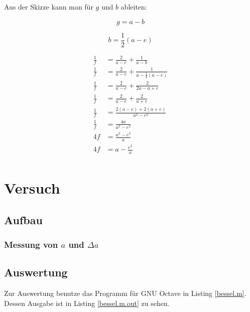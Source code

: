 \documentclass[11pt]{article}
\newcommand{\half}{\frac{1}{2}}
\begin{document}
Aus der Skizze kann man für $g$ und $b$ ableiten:

\begin{equation}
g = a-b
\end{equation}

\begin{equation}
b = \half (a-e)
\end{equation}

\begin{align*}
\frac{1}{f} &= \frac{2}{a-e} + \frac{1}{a-b} \\
\frac{1}{f} &= \frac{2}{a-e} + \frac{1}{a-\half (a-e)} \\
\frac{1}{f} &= \frac{2}{a-e} + \frac{2}{2a-a+e} \\
\frac{1}{f} &= \frac{2}{a-e} + \frac{2}{a+e} \\
\frac{1}{f} &= \frac{2(a-e) + 2(a+e)}{a^2 - e^2} \\
\frac{1}{f} &= \frac{4a}{a^2 - e^2} \\
4f &= \frac{a^2 - e^2}{a} \\
4f &= a - \frac{e^2}{a} \\
\end{align*}

\section{Versuch}

\subsection{Aufbau}

\subsubsection*{Messung von $a$ und $\Delta a$}



\subsection{Auswertung}

Zur Auswertung benutze das Programm für GNU Octave in Listing \ref{bessel.m}. Dessen Ausgabe ist in Listing \ref{bessel.m.out} zu sehen.




\end{document}
